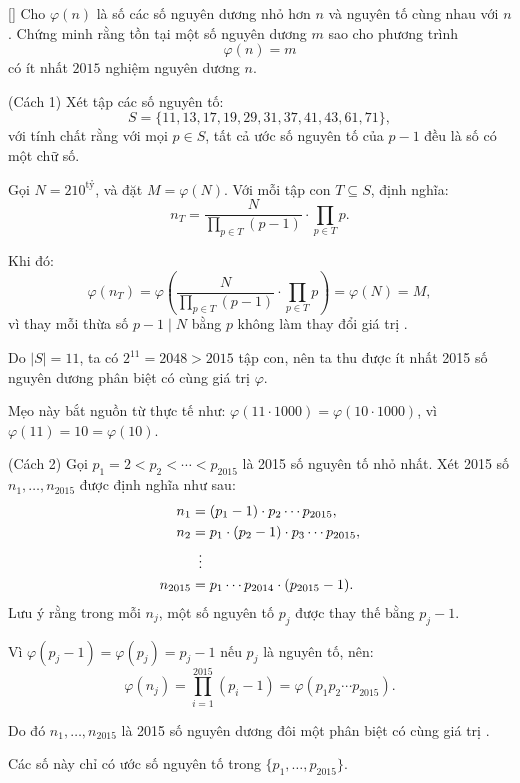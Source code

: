 \documentclass[../09-contruction-methods.tex]{subfiles}
\begin{document}
\begin{example*}\label{example:USA-2015-TSTST-P5}[\textbf{}]
	Cho $\varphi(n)$ là số các số nguyên dương nhỏ hơn $n$ và nguyên tố cùng nhau với $n$.  
	Chứng minh rằng tồn tại một số nguyên dương $m$ sao cho phương trình
	\[
		\varphi(n) = m
	\]
	có ít nhất $2015$ nghiệm nguyên dương $n$.
\end{example*}

\begin{soln}(Cách 1)\footnotemark
	Xét tập các số nguyên tố:
	\[
		S = \{ 11, 13, 17, 19, 29, 31, 37, 41, 43, 61, 71 \},
	\]
	với tính chất rằng với mọi \( p \in S \), tất cả ước số nguyên tố của \( p - 1 \) đều là số có một chữ số.
	
	Gọi \( N = 210^{\text{tỷ}} \), và đặt \( M = \varphi(N) \).
	Với mỗi tập con \( T \subseteq S \), định nghĩa:
	\[
		n_T = \frac{N}{\prod_{p \in T}(p-1)} \cdot \prod_{p \in T} p.
	\]
	
	Khi đó:
	\[
		\varphi(n_T) = \varphi\left(\frac{N}{\prod_{p \in T}(p-1)} \cdot \prod_{p \in T} p\right) = \varphi(N) = M,
	\]
	vì thay mỗi thừa số \( p-1 \mid N \) bằng \( p \) không làm thay đổi giá trị .
	
	Do \( |S| = 11 \), ta có \( 2^{11} = 2048 > 2015 \) tập con, nên ta thu được ít nhất 2015 số nguyên dương phân biệt có cùng giá trị \( \varphi \).
\end{soln}


\begin{remark*}
	Mẹo này bắt nguồn từ thực tế như:  
	\( \varphi(11 \cdot 1000) = \varphi(10 \cdot 1000) \), vì \( \varphi(11) = 10 = \varphi(10) \).
\end{remark*}
	
\begin{soln}(Cách 2)\footnotemark
	Gọi \( p_1 = 2 < p_2 < \cdots < p_{2015} \) là 2015 số nguyên tố nhỏ nhất.  
	Xét 2015 số \( n_1, \dots, n_{2015} \) được định nghĩa như sau:
	\begin{align*}
		n_1 &= (p_1 - 1)\cdot p_2 \cdots p_{2015}, \\
		n_2 &= p_1 \cdot (p_2 - 1) \cdot p_3 \cdots p_{2015}, \\
		&\vdotswithin{=} \\
		n_{2015} &= p_1 \cdots p_{2014} \cdot (p_{2015} - 1).
	\end{align*}
	Lưu ý rằng trong mỗi \( n_j \), một số nguyên tố \( p_j \) được thay thế bằng \( p_j - 1 \).  

	Vì \( \varphi(p_j - 1) = \varphi(p_j) = p_j - 1 \) nếu \( p_j \) là nguyên tố, nên:
	\[
		\varphi(n_j) = \prod_{i=1}^{2015} (p_i - 1) = \varphi(p_1 p_2 \cdots p_{2015}).
	\]

	Do đó \( n_1, \dots, n_{2015} \) là 2015 số nguyên dương đôi một phân biệt có cùng giá trị .

	Các số này chỉ có ước số nguyên tố trong \( \{p_1, \dots, p_{2015}\} \).
\end{soln}
\end{document}
